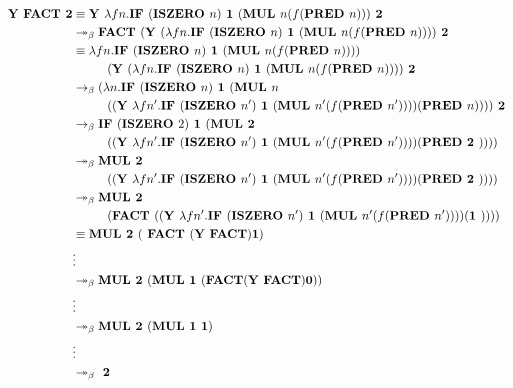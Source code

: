 \begin{esim}
\begin{align*}
\textbf{Y FACT 2} &\equiv \textbf{Y }\lambda f n. \textbf{IF } (\textbf{ISZERO } n) \textbf{ 1 } (\textbf{MUL } n  (f (\textbf{PRED } n))) \textbf{ 2} \\
&\twoheadrightarrow_{\beta} \textbf{FACT }( \textbf{Y } (\lambda f n. \textbf{IF } (\textbf{ISZERO } n ) \textbf{ 1 } (\textbf{MUL } n (f (\textbf{PRED } n))) ) \textbf{ 2} \\
&\equiv \lambda f n. \textbf{IF } (\textbf{ISZERO } n) \textbf{ 1 } (\textbf{MUL } n  (f (\textbf{PRED } n))) ) \\
	& \hspace{10 mm} ( \textbf{Y } (\lambda f n. \textbf{IF } (\textbf{ISZERO } n ) \textbf{ 1 } (\textbf{MUL } n (f (\textbf{PRED } 	n))) ) \textbf{ 2 }\\
&\rightarrow_{\beta} (\lambda n. \textbf{IF } (\textbf{ISZERO } n) \textbf{ 1 } (\textbf{MUL } n \\
	& \hspace{10 mm} (( \textbf{Y }\lambda f n'. \textbf{IF } (\textbf{ISZERO } n' ) \textbf{ 1 } (\textbf{MUL } n' (f (\textbf{PRED  	} n'))) )  (\textbf{PRED } n))) ) \textbf{ 2 }\\
&\rightarrow_{\beta} \textbf{IF } (\textbf{ISZERO } 2) \textbf{ 1 } (\textbf{MUL 2 } \\
	& \hspace{10 mm} (( \textbf{Y }\lambda f n'. \textbf{IF } (\textbf{ISZERO } n' ) \textbf{ 1 } (\textbf{MUL } n'(f (\textbf{PRED  	} n'))) )  (\textbf{PRED 2 } ))) ) \\
&\twoheadrightarrow_{\beta} \textbf{MUL 2 } \\
	& \hspace{10 mm} (( \textbf{Y }\lambda f n'. \textbf{IF } (\textbf{ISZERO } n' ) \textbf{ 1 } (\textbf{MUL } n' (f (\textbf{PRED  	} n'))) )  (\textbf{PRED 2 }))) )	\\
&\twoheadrightarrow_{\beta} \textbf{MUL 2 } \\
	& \hspace{10 mm} (\textbf{FACT } (( \textbf{Y }\lambda f n'. \textbf{IF } (\textbf{ISZERO } n' ) \textbf{ 1 } (\textbf{MUL } n' (f (\textbf{PRED } n'))) )  (\textbf{1 } ))) ) \\
& \equiv \textbf{MUL 2 } (\textbf{ FACT } ( \textbf{Y FACT} )  \textbf{1}) \\
&\vdots \\
& \twoheadrightarrow_{\beta} \textbf{MUL 2 } (\textbf{MUL 1 } ( \textbf{FACT} (\textbf{Y FACT}) \textbf{0} ) ) \\
&\vdots \\
& \twoheadrightarrow_{\beta} \textbf{MUL 2 } (\textbf{MUL 1 } \textbf{1} )\\
&\vdots \\
& \twoheadrightarrow_{\beta} \textbf{ 2 }
\end{align*}
\end{esim}
\par



